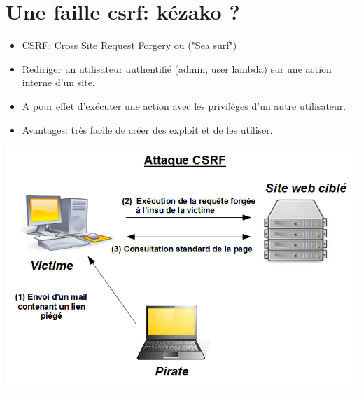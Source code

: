 \section{Une faille csrf: kézako ?}

\frame{\tableofcontents[currentsection]}

\begin{frame}

\begin{itemize}
	\item CSRF: Cross Site Request Forgery ou ("Sea surf")
	\item Rediriger un utilisateur authentifié (admin, user lambda) sur une action interne d'un site.
	\item A pour effet d'exécuter une action avec les privilèges d'un autre utilisateur.
	\item Avantages: très facile de créer des exploit et de les utiliser.
\end{itemize}

\end{frame}

\begin{frame}

\centerline{\includegraphics[scale=0.45]{csrf.png}}

\end{frame}